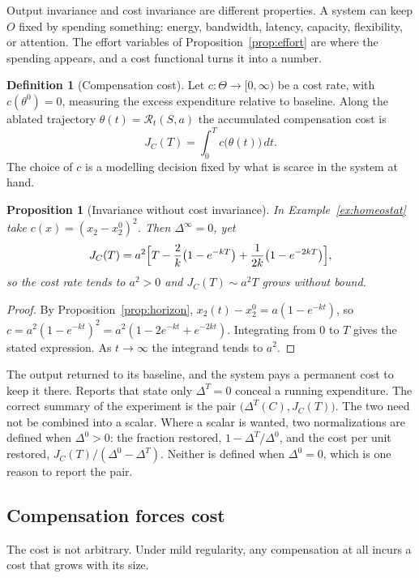 \documentclass[11pt]{article}
\newtheorem{proposition}[theorem]{Proposition}
\theoremstyle{definition}
\newtheorem{definition}[theorem]{Definition}
\theoremstyle{remark}
\newcommand{\Rop}{\mathcal{R}}
\begin{document}
Output invariance and cost invariance are different properties. A system can keep $O$ fixed by spending something: energy, bandwidth, latency, capacity, flexibility, or attention. The effort variables of Proposition~\ref{prop:effort} are where the spending appears, and a cost functional turns it into a number.

\begin{definition}[Compensation cost]
Let $c:\Theta\to[0,\infty)$ be a cost rate, with $c(\theta^0)=0$, measuring the excess expenditure relative to baseline. Along the ablated trajectory $\theta(t)=\Rop_t(S,a)$ the accumulated compensation cost is
\[
J_C(T)=\int_0^T c\bigl(\theta(t)\bigr)\,dt .
\]
The choice of $c$ is a modelling decision fixed by what is scarce in the system at hand.
\end{definition}

\begin{proposition}[Invariance without cost invariance]\label{prop:cost}
In Example~\ref{ex:homeostat} take $c(x)=(x_2-x_2^0)^2$. Then $\Delta^\infty=0$, yet
\[
J_C(T)=a^2\Bigl[T-\frac2k\bigl(1-e^{-kT}\bigr)+\frac1{2k}\bigl(1-e^{-2kT}\bigr)\Bigr],
\]
so the cost rate tends to $a^2>0$ and $J_C(T)\sim a^2T$ grows without bound.
\end{proposition}
\begin{proof}
By Proposition~\ref{prop:horizon}, $x_2(t)-x_2^0=a(1-e^{-kt})$, so $c=a^2(1-e^{-kt})^2=a^2(1-2e^{-kt}+e^{-2kt})$. Integrating from $0$ to $T$ gives the stated expression. As $t\to\infty$ the integrand tends to $a^2$.
\end{proof}

The output returned to its baseline, and the system pays a permanent cost to keep it there. Reports that state only $\Delta^T=0$ conceal a running expenditure. The correct summary of the experiment is the pair $\bigl(\Delta^T(C),J_C(T)\bigr)$. The two need not be combined into a scalar. Where a scalar is wanted, two normalizations are defined when $\Delta^0>0$: the fraction restored, $1-\Delta^T/\Delta^0$, and the cost per unit restored, $J_C(T)/(\Delta^0-\Delta^T)$. Neither is defined when $\Delta^0=0$, which is one reason to report the pair.

\subsection{Compensation forces cost}

The cost is not arbitrary. Under mild regularity, any compensation at all incurs a cost that grows with its size.
\end{document}

